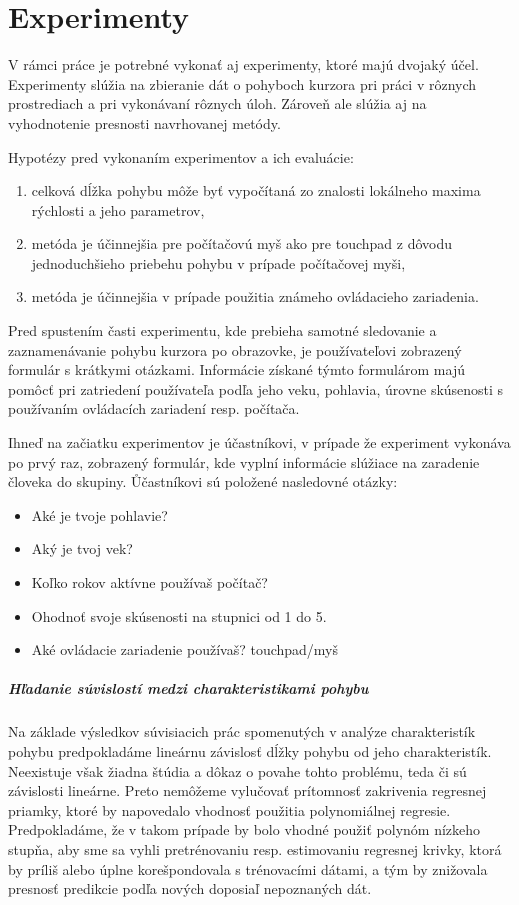 \chapter{Experimenty\label{cha:exp}}

V rámci práce je potrebné vykonať aj experimenty, ktoré majú dvojaký účel. Experimenty slúžia na zbieranie dát o pohyboch kurzora pri práci v rôznych prostrediach a pri vykonávaní rôznych úloh. Zároveň ale slúžia aj na vyhodnotenie presnosti navrhovanej metódy.

Hypotézy pred vykonaním experimentov a ich evaluácie:
\begin{enumerate}
\item celková dĺžka pohybu môže byť vypočítaná zo znalosti lokálneho maxima rýchlosti a jeho parametrov,
\item metóda je účinnejšia pre počítačovú myš ako pre touchpad z dôvodu jednoduchšieho priebehu pohybu v prípade počítačovej myši,
\item metóda je účinnejšia v prípade použitia známeho ovládacieho zariadenia.
\end{enumerate}

Pred spustením časti experimentu, kde prebieha samotné sledovanie a zaznamenávanie pohybu kurzora po obrazovke, je používateľovi zobrazený formulár s krátkymi otázkami. Informácie získané týmto formulárom majú pomôcť pri zatriedení používateľa podľa jeho veku, pohlavia, úrovne skúsenosti s používaním ovládacích zariadení resp. počítača.

Ihneď na začiatku experimentov je účastníkovi, v prípade že experiment vykonáva po prvý raz, zobrazený formulár, kde vyplní informácie slúžiace na zaradenie človeka do skupiny. Ůčastníkovi sú položené nasledovné otázky:
\begin{itemize}
\item Aké je tvoje pohlavie?
\item Aký je tvoj vek?
\item Koľko rokov aktívne používaš počítač?
\item Ohodnoť svoje skúsenosti na stupnici od 1 do 5.
\item Aké ovládacie zariadenie používaš? touchpad/myš
\end{itemize}

\paragraph*{Hľadanie súvislostí medzi charakteristikami pohybu}
Na základe výsledkov súvisiacich prác spomenutých v analýze charakteristík pohybu predpokladáme lineárnu závislosť dĺžky pohybu od jeho charakteristík. Neexistuje však žiadna štúdia a dôkaz o povahe tohto problému, teda či sú závislosti lineárne. Preto nemôžeme vylučovať prítomnosť zakrivenia regresnej priamky, ktoré by napovedalo vhodnosť použitia polynomiálnej regresie. Predpokladáme, že v takom prípade by bolo vhodné použiť polynóm nízkeho stupňa, aby sme sa vyhli pretrénovaniu resp. estimovaniu regresnej krivky, ktorá by príliš alebo úplne korešpondovala s trénovacími dátami, a tým by znižovala presnosť predikcie podľa nových doposiaľ nepoznaných dát.

